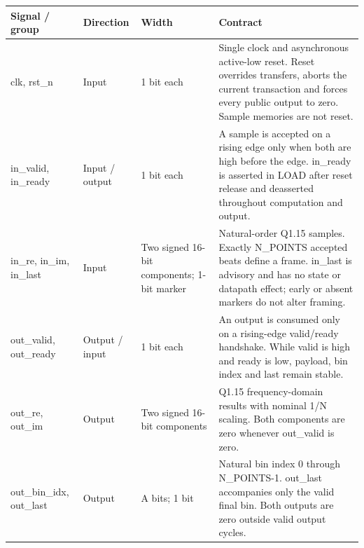 \documentclass[11pt,a4paper]{article}
\begin{document}
{\small\renewcommand{\arraystretch}{1.18}\begin{longtable}{@{}L{0.21\textwidth}|L{0.12\textwidth}|L{0.12\textwidth}|L{0.45\textwidth}@{}}\toprule

\textbf{Signal /\allowbreak{} group} & \textbf{Direction} & \textbf{Width} & \textbf{Contract}\\\midrule\endhead

clk,\allowbreak{} rst\_\allowbreak{}n & Input & 1 bit each & Single clock and asynchronous active-low reset. Reset overrides transfers,\allowbreak{} aborts the current transaction and forces every public output to zero. Sample memories are not reset.\\[2pt]\hline

in\_\allowbreak{}valid,\allowbreak{} in\_\allowbreak{}ready & Input /\allowbreak{} output & 1 bit each & A sample is accepted on a rising edge only when both are high before the edge. in\_\allowbreak{}ready is asserted in LOAD after reset release and deasserted throughout computation and output.\\[2pt]\hline

in\_\allowbreak{}re,\allowbreak{} in\_\allowbreak{}im,\allowbreak{} in\_\allowbreak{}last & Input & Two signed 16-bit components; 1-bit marker & Natural-order Q1.15 samples. Exactly N\_\allowbreak{}POINTS accepted beats define a frame. in\_\allowbreak{}last is advisory and has no state or datapath effect; early or absent markers do not alter framing.\\[2pt]\hline

out\_\allowbreak{}valid,\allowbreak{} out\_\allowbreak{}ready & Output /\allowbreak{} input & 1 bit each & An output is consumed only on a rising-edge valid/\allowbreak{}ready handshake. While valid is high and ready is low,\allowbreak{} payload,\allowbreak{} bin index and last remain stable.\\[2pt]\hline

out\_\allowbreak{}re,\allowbreak{} out\_\allowbreak{}im & Output & Two signed 16-bit components & Q1.15 frequency-domain results with nominal 1/\allowbreak{}N scaling. Both components are zero whenever out\_\allowbreak{}valid is zero.\\[2pt]\hline

out\_\allowbreak{}bin\_\allowbreak{}idx,\allowbreak{} out\_\allowbreak{}last & Output & A bits; 1 bit & Natural bin index 0 through N\_\allowbreak{}POINTS-1. out\_\allowbreak{}last accompanies only the valid final bin. Both outputs are zero outside valid output cycles.\\[2pt]\hline


\end{longtable}}
\end{document}
